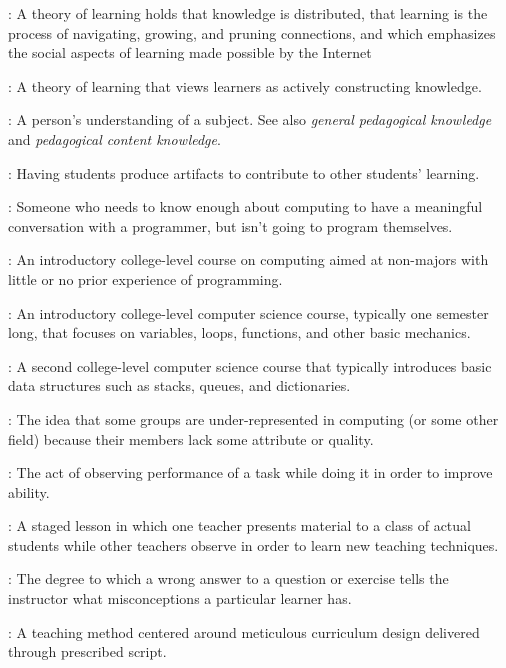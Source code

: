 \begin{description}
: A theory of learning holds that knowledge
is distributed, that learning is the process of navigating, growing, and pruning
connections, and which emphasizes the social aspects of learning made possible
by the Internet

: A theory of learning that views
learners as actively constructing knowledge.

: A person's understanding of a
subject. See also \emph{general pedagogical knowledge} and \emph{pedagogical
  content knowledge}.

: Having students
produce artifacts to contribute to other students' learning.

: Someone who
needs to know enough about computing to have a meaningful conversation with a
programmer, but isn't going to program themselves.

: An introductory college-level course on computing aimed at
non-majors with little or no prior experience of programming.

: An introductory college-level computer science course,
typically one semester long, that focuses on variables, loops, functions, and
other basic mechanics.

: A second college-level computer science course that
typically introduces basic data structures such as stacks, queues, and
dictionaries.

: The idea that some groups are
under-represented in computing (or some other field) because their members lack
some attribute or quality.

: The act of observing
performance of a task while doing it in order to improve ability.

: A staged lesson in which
one teacher presents material to a class of actual students while other teachers
observe in order to learn new teaching techniques.

: The degree to which a wrong answer
to a question or exercise tells the instructor what misconceptions a particular
learner has.

: A teaching method centered
around meticulous curriculum design delivered through prescribed script.


\end{description}
